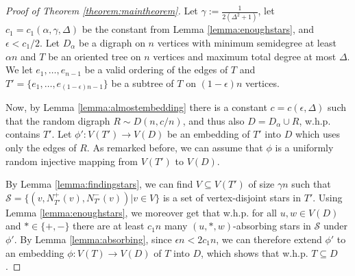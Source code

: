 \documentclass[10pt, a4paper]{article}
\theoremstyle{remark}
\begin{document}
\begin{proof}[Proof of Theorem \ref{theorem:maintheorem}]
Let $\gamma := \frac{1}{2(\Delta^2 + 1)}$, let $c_1 = c_1(\alpha, \gamma, \Delta)$ be the constant from Lemma \ref{lemma:enoughstars}, and $\epsilon < c_1 /2$. 
Let $D_\alpha$ be a digraph on $n$ vertices with minimum semidegree at least $\alpha n$ and $T$ be an oriented tree on $n$ vertices and maximum total degree at most $\Delta$.
We let $e_1, \dots, e_{n-1}$ be a valid ordering of the edges of $T$ and $T' = \{ e_1, \dots, e_{(1 -\epsilon) n-1}\}$ be a subtree of $T$ on $(1 -\epsilon) n$ vertices. 

Now, by Lemma \ref{lemma:almostembedding} there is a constant $c = c(\epsilon, \Delta)$ such that the random digraph $R \sim D(n, c/n)$, and thus also $D = D_\alpha \cup R$, w.h.p. contains $T'$.
Let $\phi' : V(T') \to V(D)$ be an embedding of $T'$ into $D$ which uses only the edges of $R$.
As remarked before, we can assume that $\phi$ is a uniformly random injective mapping from $V(T')$ to $V(D)$.

By Lemma \ref{lemma:findingstars}, we can find $V \subseteq V(T')$ of size $\gamma n$ such that $\mathcal{S} = \{ (v, N_{T'}^+(v), N_{T'}^-(v)) | v \in V\}$ is a set of vertex-disjoint stars in $T'$.
Using Lemma \ref{lemma:enoughstars}, we moreover get that w.h.p. for all $u, w \in V(D)$ and $* \in \{ +, - \}$ there are at least $c_1 n$ many $(u, *, w)$-absorbing stars in $\mathcal{S}$ under $\phi'$.
By Lemma \ref{lemma:absorbing}, since $\epsilon n < 2 c_1 n$, we can therefore extend $\phi'$ to an embedding $\phi: V(T) \to V(D)$ of $T$ into $D$, which shows that w.h.p. $T \subseteq D$. 
\end{proof}



\end{document}
